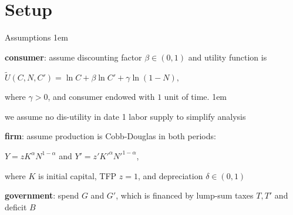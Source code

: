 \documentclass[11pt,aspectratio=43]{beamer}
\let\olditemize=\itemize
\let\endolditemize=\enditemize
\renewenvironment{itemize}{\olditemize \itemsep1em}{\endolditemize}
\theoremstyle{definition}
\begin{document}
\section{Setup}
\label{sec:Setup}

\begin{frame}{Assumptions}
\label{slide:Assumptions}
    \begin{itemize}
        \item \textbf{consumer}: assume discounting factor $ \beta \in ( 0, 1 ) $ and utility function is
        \begin{center}
            $ \displaystyle \tilde{U}( C, N, C') = \ln C + \beta \ln C' + \gamma \ln ( 1-N ),$
        \end{center}
        where $ \gamma > 0 $, and consumer endowed with $ 1 $ unit of time.
        \begin{itemize}
            \item we assume no dis-utility in date 1 labor supply to simplify analysis
        \end{itemize}
        \item \textbf{firm}: assume production is Cobb-Douglas in both periods:
        \begin{center}
            $ \displaystyle Y = z K^{\alpha} N^{1-\alpha} $ and $ \displaystyle Y' = z' K'^{\alpha} N'^{1-\alpha} $,
        \end{center}
        where $ K $ is initial capital, TFP $ z = 1 $, and depreciation $ \delta \in ( 0, 1 ) $
        \item \textbf{government}: spend $ G $ and $ G' $, which is financed by lump-sum taxes $ T, T' $ and deficit $ B $
    \end{itemize}
\end{frame}
\end{document}
